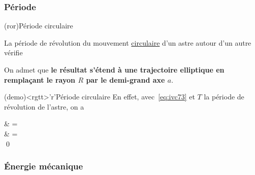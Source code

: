 \documentclass[../../main/main.tex]{subfiles}
\begin{document}
\subsubsection{Période}

\begin{tcbraster}[raster equal height=rows, raster columns=2]
	\begin{tcb*}(ror){Période circulaire}
		\begin{bfseries}
			La période de révolution du mouvement \ul{circulaire} d'un astre
			autour d'un autre vérifie
			\psw{\[\boxed{\frac{T^2}{R^3} = \frac{4\pi^2}{\Gc M_S}}\]}
		\end{bfseries}
		\vspace{-15pt}
		\tcblower
		On admet que \textbf{le résultat s'étend à une trajectoire elliptique en
			remplaçant le rayon $R$ par le demi-grand axe $a$}.
	\end{tcb*}
	\begin{tcb*}(demo)<rgtt>'r'{Période circulaire}
		En effet, avec~\eqref{eq:ivc73} et $T$ la période de révolution de l'astre,
		on a
		\begin{DispWithArrows*}
			\psw{\tp}                     & = 
			\\\Lra
			      & = 
			\\\Lra
			\qed
		\end{DispWithArrows*}
	\end{tcb*}
\end{tcbraster}

\subsubsection{Énergie mécanique}
\end{document}
